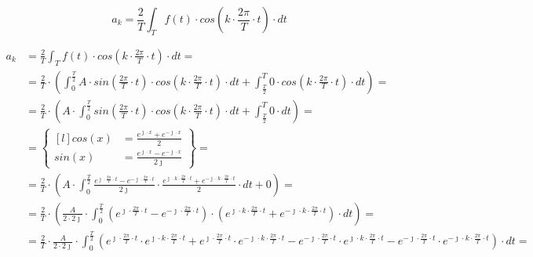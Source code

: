 \begin{task}

\begin{equation}
a_k=\frac{2}{T}\int_{T}f(t) \cdot cos\left( k \cdot \frac{2\pi}{T} \cdot t\right) \cdot dt
\end{equation}


\begin{align*}
a_k&=\frac{2}{T}\int_{T}f(t) \cdot cos\left( k \cdot \frac{2\pi}{T} \cdot t\right) \cdot dt=\\
&=\frac{2}{T}\cdot\left(\int_{0}^{\frac{T}{2}}A \cdot sin\left( \frac{2\pi}{T} \cdot t\right) \cdot cos\left( k \cdot \frac{2\pi}{T} \cdot t\right) \cdot dt+\int_{\frac{T}{2}}^{T} 0 \cdot cos\left( k \cdot \frac{2\pi}{T} \cdot t\right) \cdot dt\right)=\\
&=\frac{2}{T}\cdot\left(A \cdot \int_{0}^{\frac{T}{2}}sin\left( \frac{2\pi}{T} \cdot t\right) \cdot cos\left( k \cdot \frac{2\pi}{T} \cdot t\right) \cdot dt+\int_{\frac{T}{2}}^{T} 0 \cdot dt\right)=\\
&=\begin{Bmatrix*}[l]
cos\left(x\right)&=\frac{e^{\jmath \cdot x}+e^{-\jmath \cdot x}}{2}\\
sin\left(x\right)&=\frac{e^{\jmath \cdot x}-e^{-\jmath \cdot x}}{2 \jmath }
\end{Bmatrix*}=\\
&=\frac{2}{T}\cdot\left(A \cdot \int_{0}^{\frac{T}{2}} \frac{e^{\jmath \cdot \frac{2\pi}{T} \cdot t}-e^{-\jmath \cdot \frac{2\pi}{T} \cdot t}}{2\jmath} \cdot \frac{e^{\jmath \cdot k \cdot \frac{2\pi}{T} \cdot t}+e^{-\jmath \cdot k \cdot \frac{2\pi}{T} \cdot t}}{2} \cdot dt+0\right)=\\
&=\frac{2}{T}\cdot\left(\frac{A}{2\cdot 2\jmath} \cdot \int_{0}^{\frac{T}{2}} \left(e^{\jmath \cdot \frac{2\pi}{T} \cdot t}-e^{-\jmath \cdot \frac{2\pi}{T} \cdot t}\right)\cdot \left(e^{\jmath \cdot k \cdot \frac{2\pi}{T} \cdot t}+e^{-\jmath \cdot k \cdot \frac{2\pi}{T} \cdot t}\right) \cdot dt\right)=\\
&=\frac{2}{T} \cdot \frac{A}{2\cdot 2\jmath} \cdot \int_{0}^{\frac{T}{2}}
\left(e^{\jmath \cdot \frac{2\pi}{T} \cdot t} \cdot e^{\jmath \cdot k \cdot \frac{2\pi}{T} \cdot t} + e^{\jmath \cdot \frac{2\pi}{T} \cdot t} \cdot e^{-\jmath \cdot k \cdot \frac{2\pi}{T} \cdot t} - e^{-\jmath \cdot \frac{2\pi}{T} \cdot t} \cdot e^{\jmath \cdot k \cdot \frac{2\pi}{T} \cdot t} - e^{-\jmath \cdot \frac{2\pi}{T} \cdot t} \cdot e^{-\jmath \cdot k \cdot \frac{2\pi}{T} \cdot t} \right) \cdot dt=\\

\end{align*}
\end{task}
